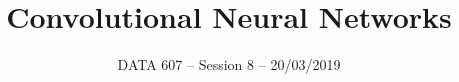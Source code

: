 \documentclass{beamer}
\begin{document}
    
\setlength{\parskip}{1em}
\begin{frame}
    \title{Convolutional Neural Networks}
    \date{DATA 607 -- Session 8 -- 20/03/2019}
    \maketitle
\end{frame}
\end{document}
